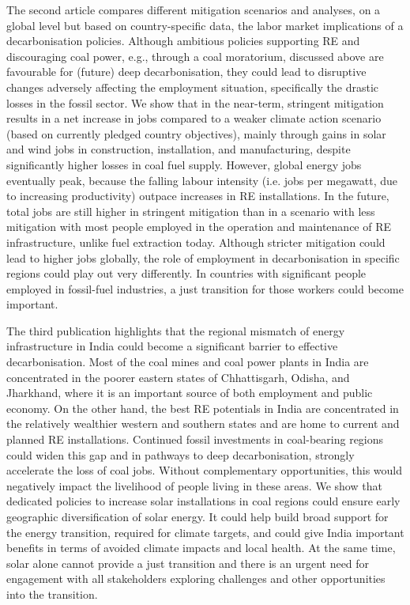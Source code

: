 \documentclass[../thesis.tex]{subfiles}
\begin{document}
The second article compares different mitigation scenarios and analyses, on a global level but based on country-specific data, the labor market implications of a decarbonisation policies. Although ambitious policies supporting RE and discouraging coal power, e.g., through a coal moratorium, discussed above are favourable for (future) deep decarbonisation, they could lead to disruptive changes adversely affecting the employment situation, specifically the drastic losses in the fossil sector. We show that in the near-term, stringent mitigation results in a net increase in jobs compared to a weaker climate action scenario (based on currently pledged country objectives), mainly through gains in solar and wind jobs in construction, installation, and manufacturing, despite significantly higher losses in coal fuel supply. However, global energy jobs eventually peak, because the falling labour intensity (i.e. jobs per megawatt, due to increasing productivity) outpace increases in RE installations. In the future, total jobs are still higher in stringent mitigation  than in a scenario with less mitigation with most people employed in the operation and maintenance of RE infrastructure, unlike fuel extraction today.  Although stricter mitigation could lead to higher jobs globally, the role of employment in decarbonisation in specific regions could play out very differently. In countries with significant people employed in fossil-fuel industries, a just transition for those workers could become important. 

The third publication highlights that the regional mismatch of energy infrastructure in India could become a significant barrier to effective decarbonisation. Most of the coal mines and coal power plants in India are concentrated in the poorer eastern states of Chhattisgarh, Odisha, and Jharkhand, where it is an important source of both employment and public economy. On the other hand, the best RE potentials in India are concentrated in the relatively wealthier western and southern states and are home to current and planned RE installations.  Continued fossil investments in coal-bearing regions could widen this gap and in pathways to deep decarbonisation, strongly accelerate the loss of coal jobs. Without complementary opportunities, this would negatively impact the livelihood of people living in these areas. We show that dedicated policies to increase solar installations in coal regions could ensure early geographic diversification of solar energy. It could help build broad support for the energy transition, required for climate targets, and could give India important benefits in terms of avoided climate impacts and local health. At the same time, solar alone cannot provide a just transition and there is an urgent need for engagement with all stakeholders exploring challenges and other opportunities into the transition. 
\end{document}
